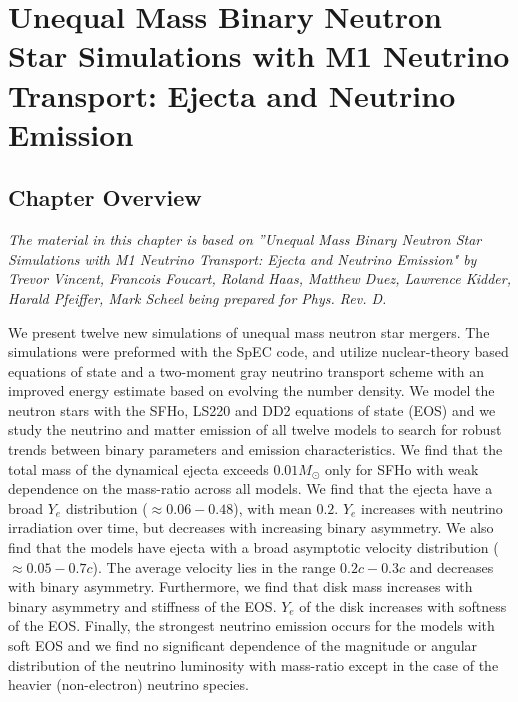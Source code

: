 \chapter{Unequal Mass Binary Neutron Star Simulations with M1 Neutrino Transport: Ejecta and Neutrino Emission}


\section{Chapter Overview}

\textit{The material in this chapter is based on ”Unequal Mass Binary Neutron Star Simulations with M1 Neutrino Transport: Ejecta and Neutrino Emission" by Trevor Vincent, Francois Foucart, Roland Haas, Matthew Duez, Lawrence Kidder, Harald Pfeiffer, Mark Scheel being prepared for Phys. Rev. D.}

We present twelve new simulations of unequal mass neutron star mergers. The simulations were preformed with the SpEC code, and utilize nuclear-theory based equations of state and a two-moment gray neutrino transport scheme with an improved energy estimate based on evolving the number density. We model the neutron stars with the SFHo, LS220 and DD2 equations of state (EOS) and we study the neutrino and matter emission of all twelve models to search for robust trends between binary parameters and emission characteristics. We find that the total mass of the dynamical ejecta exceeds $0.01M_\odot$ only for SFHo with weak dependence on the mass-ratio across all models.  We find that the  ejecta have a broad $Y_e$ distribution ($\approx 0.06-0.48$), with mean $0.2$. $Y_e$ increases with neutrino irradiation over time, but decreases with increasing binary asymmetry. We also find that the models have ejecta with a broad asymptotic velocity distribution ($\approx 0.05-0.7c$). The average velocity lies in the range $0.2c - 0.3c$ and decreases with binary asymmetry. Furthermore, we find that disk mass increases with binary asymmetry and stiffness of the EOS. $Y_e$ of the disk increases with softness of the EOS. Finally, the strongest neutrino emission occurs for the models with soft EOS and we find no significant dependence of the magnitude or angular distribution of the neutrino luminosity with mass-ratio except in the case of the heavier (non-electron) neutrino species. %

